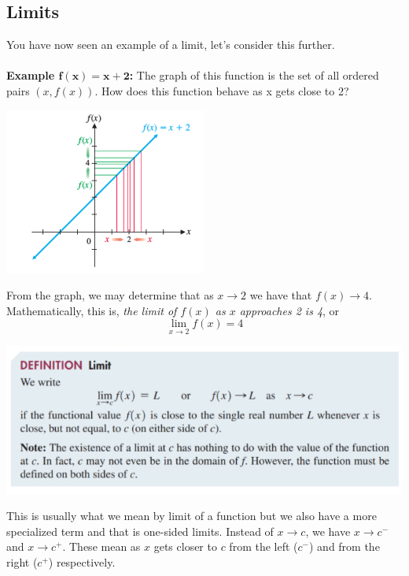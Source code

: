 \documentclass[14pt]{extarticle}
\begin{document}
\subsection{Limits}
You have now seen an example of a limit, let's consider this further.
\\\\
\textbf{Example $\mathbf{f(x) =x+2}$:} The graph of this function is the set of all ordered pairs $(x, f(x))$. How does this function behave as x gets close to 2?
\begin{center}
	\includegraphics[width=0.5\textwidth]{9-1-intro-2}
\end{center}
From the graph, we may determine that as $x\to 2$ we have that $f(x)\to 4$. Mathematically, this is, \textit{the limit of $f(x)$ as $x$ approaches 2 is 4}, or $$\lim_{x\to 2} f(x) = 4$$
\begin{center}
	\includegraphics[width=0.9\linewidth]{9-1-1}
\end{center}
This is usually what we mean by limit of a function but we also have a more specialized term and that is one-sided limits. Instead of $x \to c$, we have $x \to c^-$ and $x\to c^+$. These mean as $x$ gets closer to $c$ from the left ($c^-$) and from the right ($c^+$) respectively.
\end{document}
